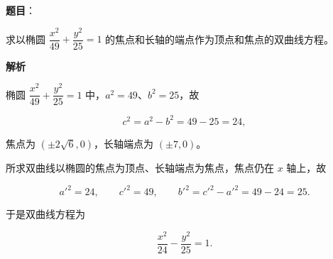 \begin{answer}

\textbf{题目}：

求以椭圆 $\dfrac{x^2}{49}+\dfrac{y^2}{25}=1$ 的焦点和长轴的端点作为顶点和焦点的双曲线方程。

\textbf{解析}

椭圆 $\dfrac{x^2}{49}+\dfrac{y^2}{25}=1$ 中，$a^2=49$、$b^2=25$，故

\nopagebreak[4]
\[
c^2=a^2-b^2=49-25=24,
\]

焦点为 $(\pm2\sqrt6,0)$，长轴端点为 $(\pm7,0)$。

所求双曲线以椭圆的焦点为顶点、长轴端点为焦点，焦点仍在 $x$ 轴上，故

\nopagebreak[4]
\[
a'^2=24,
\qquad
c'^2=49,
\qquad
b'^2=c'^2-a'^2=49-24=25.
\]

于是双曲线方程为

\nopagebreak[4]
\[
\frac{x^2}{24}-\frac{y^2}{25}=1.
\]


\end{answer}
